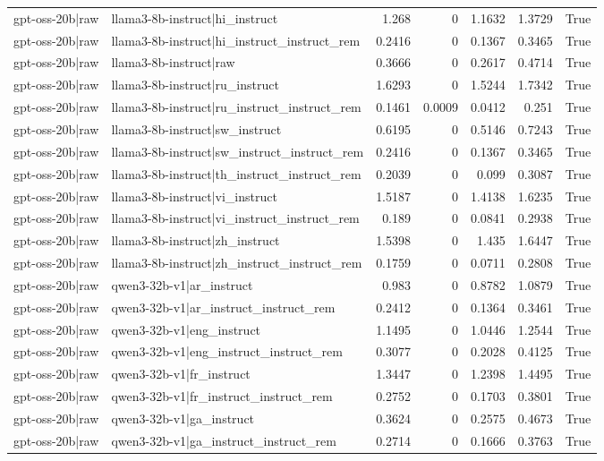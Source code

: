 \begin{table}
\begin{tabular}{l l r r r r l}
gpt-oss-20b|raw & llama3-8b-instruct|hi_instruct & 1.268 & 0 & 1.1632 & 1.3729 & True \\
gpt-oss-20b|raw & llama3-8b-instruct|hi_instruct_instruct_rem & 0.2416 & 0 & 0.1367 & 0.3465 & True \\
gpt-oss-20b|raw & llama3-8b-instruct|raw & 0.3666 & 0 & 0.2617 & 0.4714 & True \\
gpt-oss-20b|raw & llama3-8b-instruct|ru_instruct & 1.6293 & 0 & 1.5244 & 1.7342 & True \\
gpt-oss-20b|raw & llama3-8b-instruct|ru_instruct_instruct_rem & 0.1461 & 0.0009 & 0.0412 & 0.251 & True \\
gpt-oss-20b|raw & llama3-8b-instruct|sw_instruct & 0.6195 & 0 & 0.5146 & 0.7243 & True \\
gpt-oss-20b|raw & llama3-8b-instruct|sw_instruct_instruct_rem & 0.2416 & 0 & 0.1367 & 0.3465 & True \\
gpt-oss-20b|raw & llama3-8b-instruct|th_instruct_instruct_rem & 0.2039 & 0 & 0.099 & 0.3087 & True \\
gpt-oss-20b|raw & llama3-8b-instruct|vi_instruct & 1.5187 & 0 & 1.4138 & 1.6235 & True \\
gpt-oss-20b|raw & llama3-8b-instruct|vi_instruct_instruct_rem & 0.189 & 0 & 0.0841 & 0.2938 & True \\
gpt-oss-20b|raw & llama3-8b-instruct|zh_instruct & 1.5398 & 0 & 1.435 & 1.6447 & True \\
gpt-oss-20b|raw & llama3-8b-instruct|zh_instruct_instruct_rem & 0.1759 & 0 & 0.0711 & 0.2808 & True \\
gpt-oss-20b|raw & qwen3-32b-v1|ar_instruct & 0.983 & 0 & 0.8782 & 1.0879 & True \\
gpt-oss-20b|raw & qwen3-32b-v1|ar_instruct_instruct_rem & 0.2412 & 0 & 0.1364 & 0.3461 & True \\
gpt-oss-20b|raw & qwen3-32b-v1|eng_instruct & 1.1495 & 0 & 1.0446 & 1.2544 & True \\
gpt-oss-20b|raw & qwen3-32b-v1|eng_instruct_instruct_rem & 0.3077 & 0 & 0.2028 & 0.4125 & True \\
gpt-oss-20b|raw & qwen3-32b-v1|fr_instruct & 1.3447 & 0 & 1.2398 & 1.4495 & True \\
gpt-oss-20b|raw & qwen3-32b-v1|fr_instruct_instruct_rem & 0.2752 & 0 & 0.1703 & 0.3801 & True \\
gpt-oss-20b|raw & qwen3-32b-v1|ga_instruct & 0.3624 & 0 & 0.2575 & 0.4673 & True \\
gpt-oss-20b|raw & qwen3-32b-v1|ga_instruct_instruct_rem & 0.2714 & 0 & 0.1666 & 0.3763 & True \\

\end{tabular}
\end{table}
